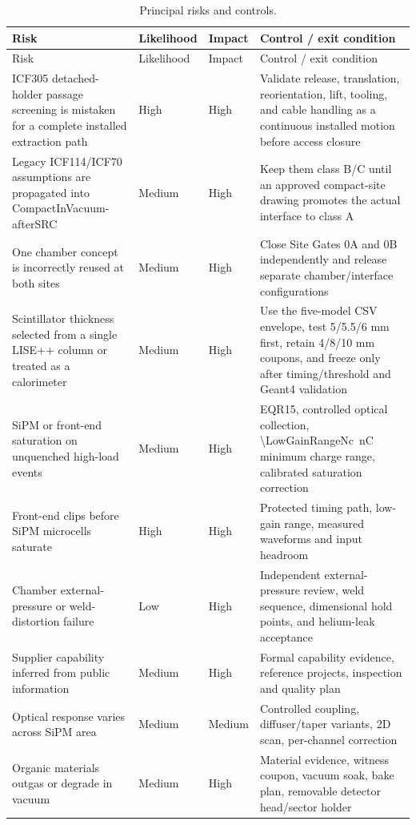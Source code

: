 \documentclass[10pt,letterpaper]{article}
\begin{document}
\begin{longtable}{L{0.27\textwidth}C{0.10\textwidth}C{0.10\textwidth}L{0.37\textwidth}}
  \caption{Principal risks and controls.}\\
  \toprule
  Risk & Likelihood & Impact & Control / exit condition \\
  \midrule
  \endfirsthead
  \toprule
  Risk & Likelihood & Impact & Control / exit condition \\
  \midrule
  \endhead
  ICF305 detached-holder passage screening is mistaken for a complete installed extraction path &
    High & High & Validate release, translation, reorientation, lift, tooling, and cable handling
    as a continuous installed motion before access closure \\
  Legacy ICF114/ICF70 assumptions are propagated into CompactInVacuum-afterSRC &
    Medium & High & Keep them class B/C until an approved compact-site drawing promotes the
    actual interface to class A \\
  One chamber concept is incorrectly reused at both sites &
    Medium & High & Close Site Gates 0A and 0B independently and release separate chamber/interface
    configurations \\
  Scintillator thickness selected from a single LISE++ column or treated as a calorimeter &
    Medium & High & Use the five-model CSV envelope, test 5/5.5/6 mm first, retain 4/8/10 mm
    coupons, and freeze only after timing/threshold and Geant4 validation \\
  SiPM or front-end saturation on unquenched high-load events &
    Medium & High & EQR15, controlled optical collection, \SI{\LowGainRangeNc}{\nano\coulomb}
    minimum charge range, calibrated saturation correction \\
  Front-end clips before SiPM microcells saturate &
    High & High & Protected timing path, low-gain range, measured waveforms and input headroom \\
  Chamber external-pressure or weld-distortion failure &
    Low & High & Independent external-pressure review, weld sequence, dimensional hold points,
    and helium-leak acceptance \\
  Supplier capability inferred from public information &
    Medium & High & Formal capability evidence, reference projects, inspection and quality plan \\
  Optical response varies across SiPM area &
    Medium & Medium & Controlled coupling, diffuser/taper variants, 2D scan, per-channel correction \\
  Organic materials outgas or degrade in vacuum &
    Medium & High & Material evidence, witness coupon, vacuum soak, bake plan, removable detector head/sector holder \\
  \bottomrule
\end{longtable}
\end{document}
